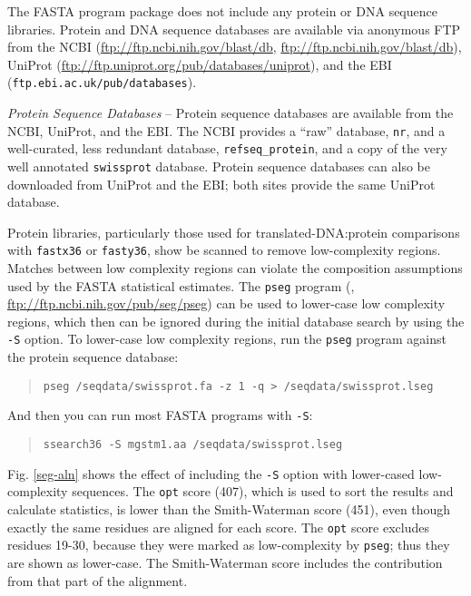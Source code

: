 \documentclass[11pt]{article}
\begin{document}
The FASTA program package does not include any protein or DNA sequence
libraries.  Protein and DNA sequence databases are available via
anonymous FTP from the NCBI (\url{ftp://ftp.ncbi.nih.gov/blast/db},
\url{ftp://ftp.ncbi.nih.gov/blast/db}), UniProt
(\url{ftp://ftp.uniprot.org/pub/databases/uniprot}), and the EBI
(\texttt{ftp.ebi.ac.uk/pub/databases}).

\emph{Protein Sequence Databases} -- Protein sequence databases are
available from the NCBI, UniProt, and the EBI.  The NCBI provides a
``raw'' database, \texttt{nr}, and a well-curated, less redundant
database, \texttt{refseq\_protein}, and a copy of the very well
annotated \texttt{swissprot} database. Protein sequence databases can
also be downloaded from UniProt and the EBI; both sites provide the
same UniProt\cite{uniprot11} database.

Protein libraries, particularly those used for translated-DNA:protein
comparisons with \texttt{fastx36} or \texttt{fasty36}, show be scanned
to remove low-complexity regions.  Matches between low complexity
regions can violate the composition assumptions used by the FASTA
statistical estimates. The \texttt{pseg} program (\cite{woo935},
\url{ftp://ftp.ncbi.nih.gov/pub/seg/pseg}) can be used to lower-case
low complexity regions, which then can be ignored during the initial
database search by using the \texttt{-S} option.  To lower-case low
complexity regions, run the \texttt{pseg} program against the protein sequence database:
\begin{quote}
\begin{verbatim}
pseg /seqdata/swissprot.fa -z 1 -q > /seqdata/swissprot.lseg
\end{verbatim}
\end{quote}
And then you can run most FASTA programs with \texttt{-S}:
\begin{quote}
\begin{verbatim}
ssearch36 -S mgstm1.aa /seqdata/swissprot.lseg
\end{verbatim}
\end{quote}

Fig. \ref{seg-aln} shows the effect of including the \texttt{-S}
option with lower-cased low-complexity sequences.  The \texttt{opt}
score (407), which is used to sort the results and calculate
statistics, is lower than the Smith-Waterman score (451), even though
exactly the same residues are aligned for each score. The \texttt{opt}
score excludes residues 19-30, because they were marked as
low-complexity by \texttt{pseg}; thus they are shown as lower-case.
The Smith-Waterman score includes the contribution from that part of
the alignment.
\end{document}
